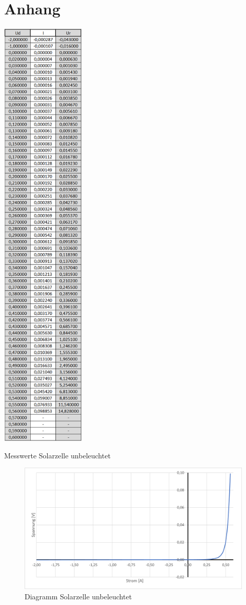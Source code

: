 \documentclass[a4paper]{scrartcl}
\numberwithin{equation}{subsection}
\begin{document}
\newpage
\section{Anhang}
\label{sec:Anhang}
\begin{table}[H]
\includegraphics[width=4cm]{Tabelle_unbeleuchtet}
\centering
\caption{Messwerte Solarzelle unbeleuchtet}
\end{table}

\begin{figure}[H]
\includegraphics[width=14cm]{Diagramm_unbeleuchtet}
\centering
\caption{Diagramm Solarzelle unbeleuchtet}
\centering
\end{figure}
\end{document}
